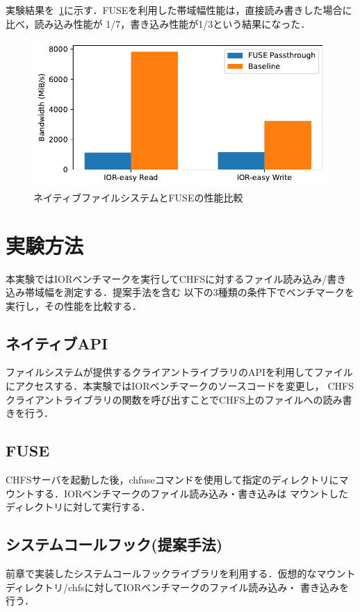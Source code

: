 \documentclass[a4paper，11pt]{jreport}
\begin{document}
実験結果を\figurename~\ref{fig:FUSE Performance}に示す．FUSEを利用した帯域幅性能は，直接読み書きした場合に比べ，読み込み性能が
1/7，書き込み性能が1/3という結果になった．

\newpage

\begin{figure}[h]
	\begin{minipage}[b]{1\columnwidth}
		\centering
		\includegraphics[width=0.9\linewidth]{./figure/fuse_overhead.ssd.pdf}
		\caption{ネイティブファイルシステムとFUSEの性能比較}
		\label{fig:FUSE Performance}
	\end{minipage}
\end{figure}
\section{実験方法}
本実験ではIORベンチマークを実行してCHFSに対するファイル読み込み/書き込み帯域幅を測定する．提案手法を含む
以下の3種類の条件下でベンチマークを実行し，その性能を比較する．

\subsection{ネイティブAPI}
ファイルシステムが提供するクライアントライブラリのAPIを利用してファイルにアクセスする．本実験ではIORベンチマークのソースコードを変更し，
CHFSクライアントライブラリの関数を呼び出すことでCHFS上のファイルへの読み書きを行う．
\subsection{FUSE}
CHFSサーバを起動した後，chfuseコマンドを使用して指定のディレクトリにマウントする．IORベンチマークのファイル読み込み・書き込みは
マウントしたディレクトリに対して実行する．
\subsection{システムコールフック(提案手法)}
前章で実装したシステムコールフックライブラリを利用する．仮想的なマウントディレクトリ/chfsに対してIORベンチマークのファイル読み込み・
書き込みを行う．
\end{document}
